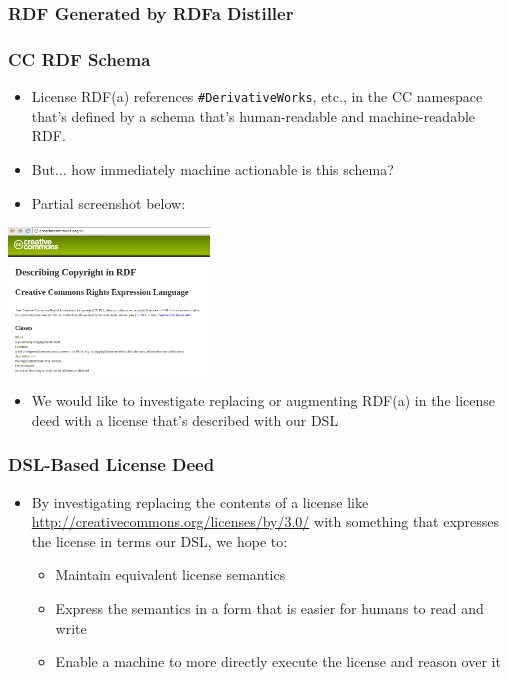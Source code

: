 \documentclass[mathserif,xcolor=dvipsnames,handout]{beamer}
\begin{document}
\begin{frame}[fragile]
\frametitle{RDF Generated by RDFa Distiller}

\end{frame}

\begin{frame}[t]
\frametitle{CC RDF Schema}
        \begin{itemize}
            \item License RDF(a) references \texttt{\#DerivativeWorks}, etc., in the CC namespace that's defined by a schema that's human-readable and machine-readable RDF.
            \item But... how immediately machine actionable is this schema?
            \item Partial screenshot below:
        \end{itemize}
        \begin{center}
            \includegraphics[width=0.4\textwidth]{schema-screenshot-partial.png}
        \end{center}
        \begin{itemize}
            \item We would like to investigate replacing or augmenting RDF(a)
            in the license deed with a license that's described with our DSL
        \end{itemize}
\end{frame}

\begin{frame}[t]
\frametitle{DSL-Based License Deed}
    \begin{itemize}
        \item By investigating replacing the contents of a license like
        \url{http://creativecommons.org/licenses/by/3.0/} with something that
        expresses the license in terms our DSL, we hope to:
        \begin{itemize}
            \item Maintain equivalent license semantics
            \item Express the semantics in a form that is easier for humans to read and write
            \item Enable a machine to more directly execute the license and reason over it
        \end{itemize}
    \end{itemize}
\end{frame}
\end{document}
